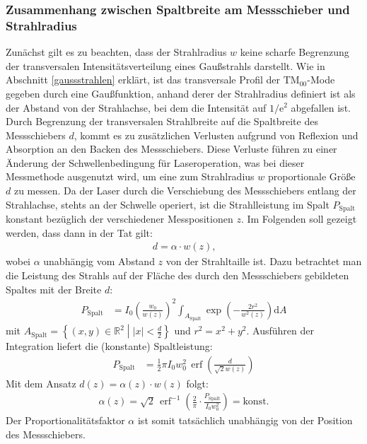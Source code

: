 \documentclass[11pt, a4paper]{article}
\numberwithin{equation}{section}
\DeclareMathOperator{\erf}{erf}
\begin{document}
\subsubsection{Zusammenhang zwischen Spaltbreite am Messschieber und Strahlradius}
\label{sssec:spaltbreite_strahlradius}
Zunächst gilt es zu beachten, dass der Strahlradius $w$ keine scharfe Begrenzung der transversalen Intensitätsverteilung eines Gaußstrahls darstellt.
Wie in Abschnitt \ref{gaussstrahlen} erklärt, ist das transversale Profil der $\mathrm{TM}_{00}$-Mode gegeben durch eine Gaußfunktion, anhand derer der Strahlradius definiert ist als der Abstand von der Strahlachse, bei dem die Intensität auf $1/\mathrm{e}^2$ abgefallen ist.
Durch Begrenzung der transversalen Strahlbreite auf die Spaltbreite des Messschiebers $d$, kommt es zu zusätzlichen Verlusten aufgrund von Reflexion und Absorption an den Backen des Messschiebers.
Diese Verluste führen zu einer Änderung der Schwellenbedingung für Laseroperation, was bei dieser Messmethode ausgenutzt wird, um eine zum Strahlradius $w$ proportionale Größe $d$ zu messen.
Da der Laser durch die Verschiebung des Messschiebers entlang der Strahlachse, stehts an der Schwelle operiert, ist die Strahlleistung im Spalt $P_\mathrm{Spalt}$ konstant bezüglich der verschiedener Messpositionen $z$.
Im Folgenden soll gezeigt werden, dass dann in der Tat gilt:
\begin{align}
	d = \alpha \cdot w(z) \text{,}
\end{align}
wobei $\alpha$ unabhängig vom Abstand $z$ von der Strahltaille ist.
Dazu betrachtet man die Leistung des Strahls auf der Fläche des durch den Messschiebers gebildeten Spaltes mit der Breite $d$:
\begin{align}
	P_\mathrm{Spalt} &= I_0 \left( \frac{w_0}{w(z)} \right)^2 \int_{A_\mathrm{Spalt}} \exp\left( -\frac{2 r^2}{w^2(z)} \right) \mathrm{d}A
\end{align}
mit $A_\mathrm{Spalt} = \left\{(x,y) \in \mathbb{R}^2 \middle| |x| < \frac{d}{2} \right\}$ und $r^2 = x^2 + y^2$.
Ausführen der Integration liefert die (konstante) Spaltleistung:
\begin{align}
	P_\mathrm{Spalt} &= \frac{1}{2} \pi I_0 w_0^2 \,\erf\left( \frac{d}{\sqrt{2} w(z)} \right)
\end{align}
Mit dem Ansatz $d(z) = \alpha(z) \cdot w(z)$ folgt:
\begin{align}
	\alpha(z) = \sqrt{2} \, \erf^{-1}\left( \frac{2}{\pi} \cdot \frac{P_\mathrm{Spalt}}{I_0 w_0^2}\right) = \mathrm{konst.}
\end{align}
Der Proportionalitätsfaktor $\alpha$ ist somit tatsächlich unabhängig von der Position des Messschiebers.
\end{document}
